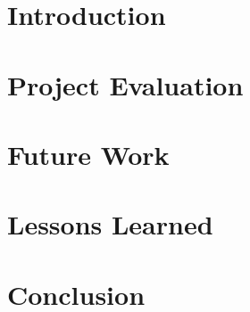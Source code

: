 \section{Introduction}
\section{Project Evaluation}
\section{Future Work}
\section{Lessons Learned}
\section{Conclusion}